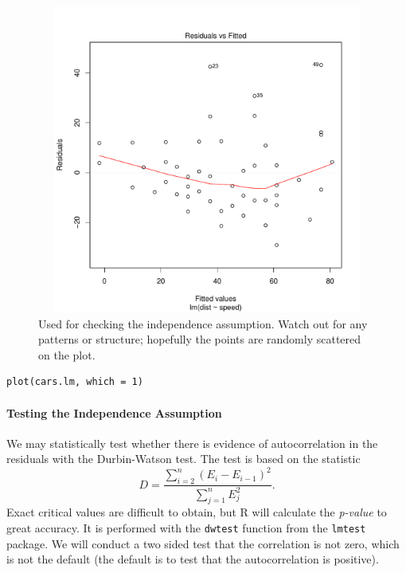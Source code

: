\documentclass[captions=tableheading]{scrbook}
\begin{document}
\begin{figure}[ht!]
  \includegraphics[width=5in, height=4in]{img/resids-fitted-cars.pdf}
  \caption[Plot of the residuals versus the fitted values for the \texttt{cars}
data]{\small Used for checking the independence assumption. Watch out for any patterns or structure; hopefully the points are randomly scattered on the plot.}
  \label{fig:resids-fitted-cars}
\end{figure}


\begin{verbatim}
plot(cars.lm, which = 1)
\end{verbatim}

\paragraph*{Testing the Independence Assumption}

We may statistically test whether there is evidence of autocorrelation in the residuals with the Durbin-Watson test. The test is based on the statistic
\begin{equation}
D=\frac{\sum_{i=2}^{n}(E_{i}-E_{i-1})^{2}}{\sum_{j=1}^{n}E_{j}^{2}}.
\end{equation}
Exact critical values are difficult to obtain, but \textsf{R} will calculate the \emph{p-value} to great accuracy. It is performed with the \texttt{dwtest} function from the \texttt{lmtest} package. We will conduct a two sided test that the correlation is not zero, which is not the default (the default is to test that the autocorrelation is positive).
\end{document}
